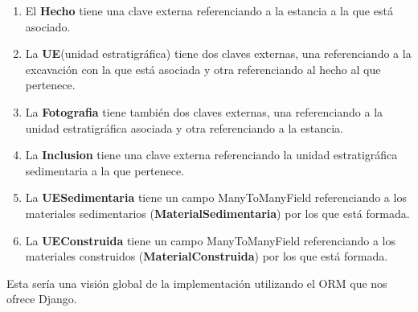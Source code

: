         \begin{enumerate}
            \item El \textbf{Hecho} tiene una clave externa referenciando a la estancia a la
            que está asociado.
            \item La \textbf{UE}(unidad estratigráfica) tiene dos claves externas, una
            referenciando a la excavación con la que está asociada y otra referenciando al
            hecho al que pertenece.
            \item La \textbf{Fotografia} tiene también dos claves externas, una referenciando
            a la unidad estratigráfica asociada y otra referenciando a la estancia.
            \item La \textbf{Inclusion} tiene una clave externa referenciando la unidad
            estratigráfica sedimentaria a la que pertenece.
            \item La \textbf{UESedimentaria} tiene un campo ManyToManyField referenciando a
            los materiales sedimentarios (\textbf{MaterialSedimentaria}) por los que está
            formada.
            \item La \textbf{UEConstruida} tiene un campo ManyToManyField referenciando a
            los materiales construidos (\textbf{MaterialConstruida}) por los que está
            formada.
        \end{enumerate}

    Esta sería una visión global de la implementación utilizando el ORM que nos ofrece Django.
